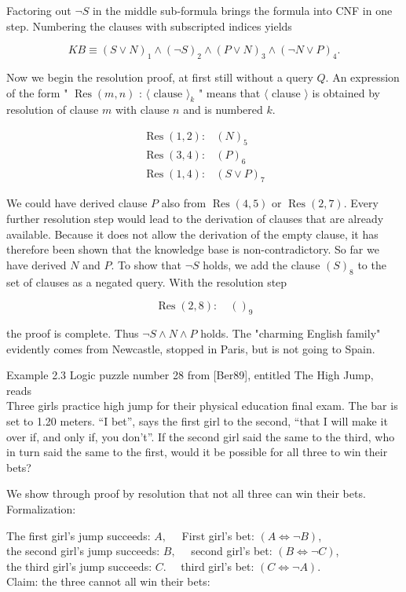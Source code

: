 \documentclass[10pt]{book}
\begin{document}
Factoring out $\neg S$ in the middle sub-formula brings the formula into CNF in one step. Numbering the clauses with subscripted indices yields

$$
K B \equiv(S \vee N)_{1} \wedge(\neg S)_{2} \wedge(P \vee N)_{3} \wedge(\neg N \vee P)_{4} .
$$

Now we begin the resolution proof, at first still without a query $Q$. An expression of the form " $\operatorname{Res}(m, n)$ : $\langle\text { clause }\rangle_{k}$ " means that $\langle$ clause $\rangle$ is obtained by resolution of clause $m$ with clause $n$ and is numbered $k$.

$$
\begin{array}{ll}
\operatorname{Res}(1,2): & (N)_{5} \\
\operatorname{Res}(3,4): & (P)_{6} \\
\operatorname{Res}(1,4): & (S \vee P)_{7}
\end{array}
$$

We could have derived clause $P$ also from $\operatorname{Res}(4,5)$ or $\operatorname{Res}(2,7)$. Every further resolution step would lead to the derivation of clauses that are already available. Because it does not allow the derivation of the empty clause, it has therefore been shown that the knowledge base is non-contradictory. So far we have derived $N$ and $P$. To show that $\neg S$ holds, we add the clause $(S)_{8}$ to the set of clauses as a negated query. With the resolution step

$$
\operatorname{Res}(2,8): \quad()_{9}
$$

the proof is complete. Thus $\neg S \wedge N \wedge P$ holds. The "charming English family" evidently comes from Newcastle, stopped in Paris, but is not going to Spain.

Example 2.3 Logic puzzle number 28 from [Ber89], entitled The High Jump, reads\\
Three girls practice high jump for their physical education final exam. The bar is set to 1.20 meters. ``I bet'', says the first girl to the second, ``that I will make it over if, and only if, you don't''. If the second girl said the same to the third, who in turn said the same to the first, would it be possible for all three to win their bets?

We show through proof by resolution that not all three can win their bets.\\
Formalization:

The first girl's jump succeeds: $A, \quad$ First girl's bet: $(A \Leftrightarrow \neg B)$,\\
the second girl's jump succeeds: $B, \quad$ second girl's bet: $(B \Leftrightarrow \neg C)$,\\
the third girl's jump succeeds: $C. \quad$ third girl's bet: $(C \Leftrightarrow \neg A)$.\\
Claim: the three cannot all win their bets:
\end{document}
